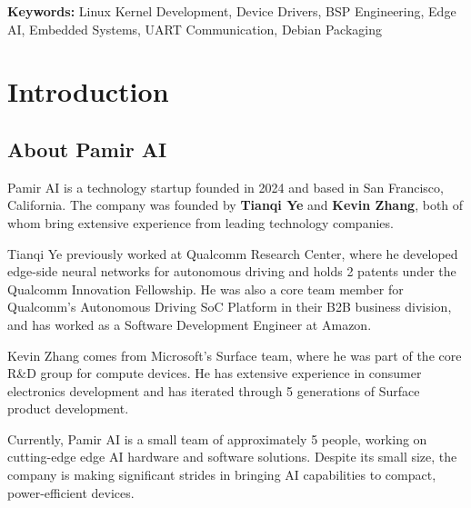 \documentclass[12pt,a4paper]{report}
\begin{document}
\vspace{1cm}

\noindent
\textbf{Keywords:} Linux Kernel Development, Device Drivers, BSP Engineering, Edge AI, Embedded Systems, UART Communication, Debian Packaging

\newpage
\tableofcontents

\newpage
{}

\chapter{Introduction}

\section{About Pamir AI}

Pamir AI is a technology startup founded in 2024 and based in San Francisco, California. The company was founded by \textbf{Tianqi Ye} and \textbf{Kevin Zhang}, both of whom bring extensive experience from leading technology companies.

\vspace{0.3cm}

Tianqi Ye previously worked at Qualcomm Research Center, where he developed edge-side neural networks for autonomous driving and holds 2 patents under the Qualcomm Innovation Fellowship. He was also a core team member for Qualcomm's Autonomous Driving SoC Platform in their B2B business division, and has worked as a Software Development Engineer at Amazon.

\vspace{0.3cm}

Kevin Zhang comes from Microsoft's Surface team, where he was part of the core R\&D group for compute devices. He has extensive experience in consumer electronics development and has iterated through 5 generations of Surface product development.

\vspace{0.3cm}

Currently, Pamir AI is a small team of approximately 5 people, working on cutting-edge edge AI hardware and software solutions. Despite its small size, the company is making significant strides in bringing AI capabilities to compact, power-efficient devices.
\end{document}
